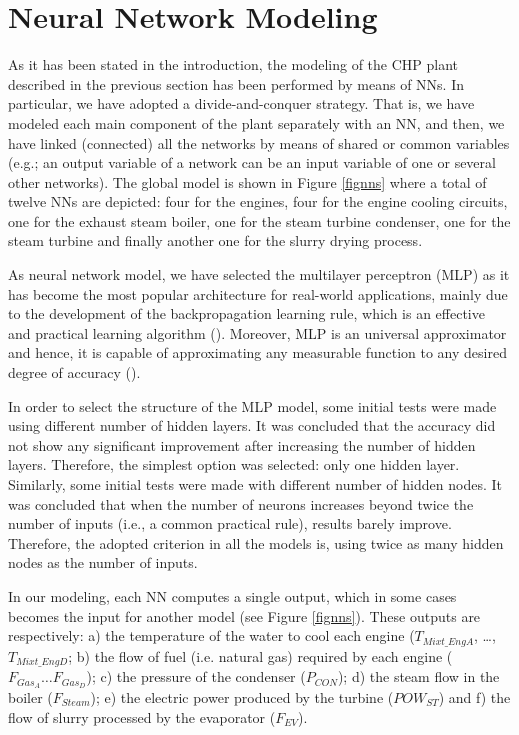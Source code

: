 \section{Neural Network Modeling}
\label{NN}

As it has been stated in the introduction, the modeling of the CHP plant described in the previous section has been performed by means of  NNs. In particular, we have adopted a divide-and-conquer strategy. That is, we have modeled each main component of the plant separately with an NN, and then, we have linked (connected) all the networks by means of shared or common variables (e.g.; an output variable of a network can be an input variable of one or several other networks). The global model is shown in Figure \ref{fignns} where a total of twelve NNs are depicted: four for the engines, four for the engine cooling  circuits, one for the exhaust steam boiler, one for the steam turbine condenser, one for the steam turbine and finally another one for the slurry drying process. 

As neural network model, we have selected the multilayer perceptron (MLP) as it has become the most popular architecture for real-world applications, mainly due to the development of the backpropagation learning rule, which is an effective and practical learning algorithm (\cite{Khota-1998}). Moreover, MLP  is an universal approximator and hence, it is capable of approximating any measurable function to any desired degree of accuracy (\cite{Hornik-1989}).

In order to select the structure of the MLP model, some initial tests were made using different number of hidden layers. It was concluded that the accuracy did not show any significant improvement after increasing the number of hidden layers. Therefore, the simplest option was selected: only one hidden layer. Similarly, some initial tests were made with different number of hidden nodes. It was concluded that when the number of neurons increases beyond twice the number of inputs (i.e., a common practical rule), results barely improve. Therefore, the adopted criterion in all the models is, using twice as many hidden nodes as the number of inputs.

In our modeling,  each NN computes a single output, which in some cases becomes the input for another model (see Figure \ref{fignns}).  These outputs are respectively: a) the temperature of the water to cool each engine ($T_{Mixt\_EngA}$, \dots, $T_{Mixt\_EngD}$; b) the flow of fuel (i.e. natural gas) required by each engine ($F_{Gas_A} \dots F_{Gas_D}$); c) the pressure of the condenser ($P_{CON}$); d) the steam flow in the boiler ($F_{Steam}$); e) the electric power produced by the turbine ($POW_{ST}$) and f) the flow of slurry processed by the evaporator ($F_{EV}$). 


